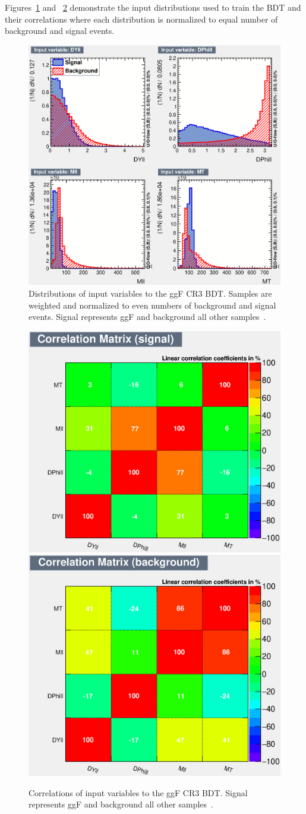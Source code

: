 Figures~\ref{fig:ggFCR3BDTinput} and ~\ref{fig:ggFCR3corrSB} demonstrate the input distributions used to train the BDT and their correlations where each distribution is normalized to equal number of background and signal events. 

\begin{figure}[!htbp]
    \centering
    \includegraphics[width=0.7\linewidth]{Pictures/ggFCR3/variables_id_c1.eps}
    \caption{Distributions of input variables to the ggF CR3 BDT. Samples are weighted and normalized to even numbers of background and signal events. Signal represents ggF and background all other samples~\cite{ourSupportNote}.}
    \label{fig:ggFCR3BDTinput}
\end{figure}
\begin{figure}[!htbp]
\centering
  \includegraphics[width=.45\linewidth]{Pictures/ggFCR3/CorrelationMatrixS.eps}
  \includegraphics[width=.45\linewidth]{Pictures/ggFCR3/CorrelationMatrixB.eps}
\caption{Correlations of input variables to the ggF CR3 BDT. Signal represents ggF and background all other samples~\cite{ourSupportNote}.}
\label{fig:ggFCR3corrSB}
\end{figure}

